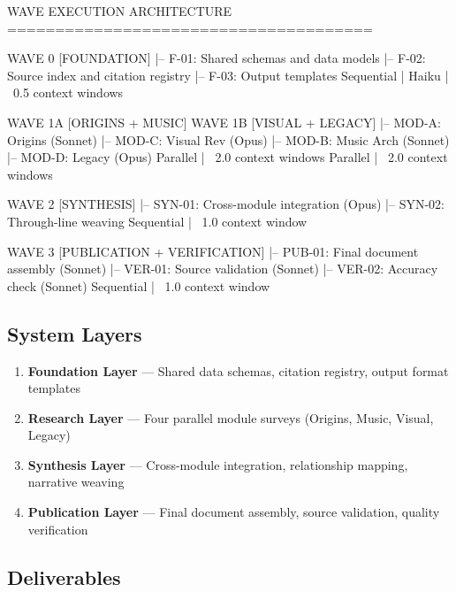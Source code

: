 \documentclass[11pt,letterpaper]{article}
\begin{document}
\begin{asciibox}
WAVE EXECUTION ARCHITECTURE
======================================

WAVE 0 [FOUNDATION]
  |-- F-01: Shared schemas and data models
  |-- F-02: Source index and citation registry
  |-- F-03: Output templates
  Sequential | Haiku | ~0.5 context windows

WAVE 1A [ORIGINS + MUSIC]            WAVE 1B [VISUAL + LEGACY]
  |-- MOD-A: Origins (Sonnet)          |-- MOD-C: Visual Rev (Opus)
  |-- MOD-B: Music Arch (Sonnet)       |-- MOD-D: Legacy (Opus)
  Parallel | ~2.0 context windows      Parallel | ~2.0 context windows

WAVE 2 [SYNTHESIS]
  |-- SYN-01: Cross-module integration (Opus)
  |-- SYN-02: Through-line weaving
  Sequential | ~1.0 context window

WAVE 3 [PUBLICATION + VERIFICATION]
  |-- PUB-01: Final document assembly (Sonnet)
  |-- VER-01: Source validation (Sonnet)
  |-- VER-02: Accuracy check (Sonnet)
  Sequential | ~1.0 context window
\end{asciibox}

\subsection{System Layers}

\begin{enumerate}
  \item \textbf{Foundation Layer} --- Shared data schemas, citation registry, output format templates
  \item \textbf{Research Layer} --- Four parallel module surveys (Origins, Music, Visual, Legacy)
  \item \textbf{Synthesis Layer} --- Cross-module integration, relationship mapping, narrative weaving
  \item \textbf{Publication Layer} --- Final document assembly, source validation, quality verification
\end{enumerate}

\subsection{Deliverables}
\end{document}
